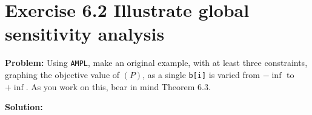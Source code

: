 \section{Exercise 6.2 Illustrate global sensitivity analysis}
\textbf{Problem:} Using {\tt AMPL}, make an original example, with at least three constraints, graphing the objective value of $(P)$, as a single {\tt b[i]} is varied from $-\inf$ to $+\inf$. As you work on this, bear in mind Theorem 6.3.

\textbf{Solution:}  